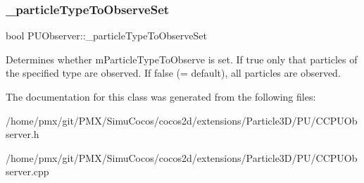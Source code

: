 \subsubsection{\texorpdfstring{\+\_\+particle\+Type\+To\+Observe\+Set}{\_particleTypeToObserveSet}}
{\footnotesize\ttfamily bool P\+U\+Observer\+::\+\_\+particle\+Type\+To\+Observe\+Set\hspace{0.3cm}{\ttfamily [protected]}}

Determines whether m\+Particle\+Type\+To\+Observe is set. If true only that particles of the specified type are observed. If false (= default), all particles are observed. 

The documentation for this class was generated from the following files\+:\begin{DoxyCompactItemize}
\item 
/home/pmx/git/\+P\+M\+X/\+Simu\+Cocos/cocos2d/extensions/\+Particle3\+D/\+P\+U/C\+C\+P\+U\+Observer.\+h\item 
/home/pmx/git/\+P\+M\+X/\+Simu\+Cocos/cocos2d/extensions/\+Particle3\+D/\+P\+U/C\+C\+P\+U\+Observer.\+cpp\end{DoxyCompactItemize}
